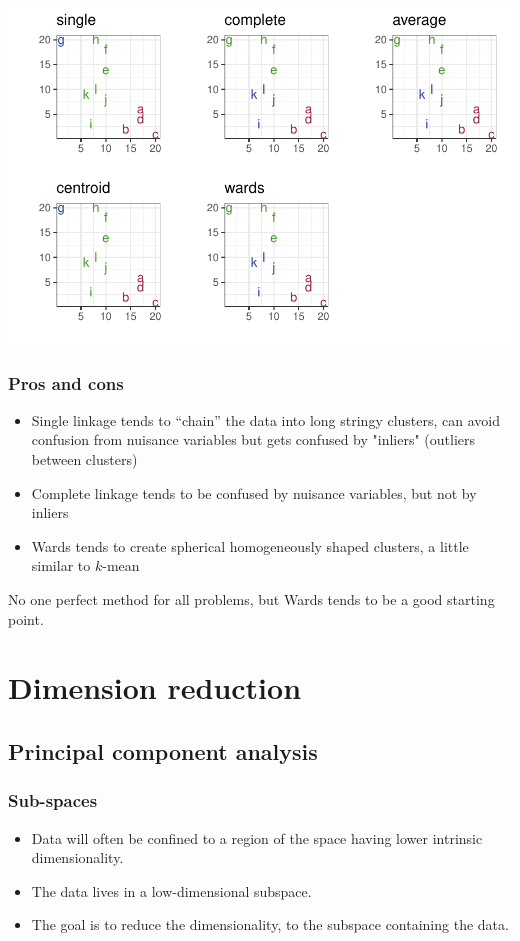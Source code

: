 \documentclass[a4paper]{article}\usepackage[]{graphicx}\usepackage[]{xcolor}
\makeatletter
\def\maxwidth{ %
  \ifdim\Gin@nat@width>\linewidth
    \linewidth
  \else
    \Gin@nat@width
  \fi
}
\makeatother
\begin{document}
\begin{Schunk}
{\centering \includegraphics[width=\maxwidth]{figure/listings-unnamed-chunk-484-1} 

}

\end{Schunk}
\subsubsection{Pros and cons}
\begin{itemize}
	\item Single linkage tends to ``chain'' the data into long stringy clusters, can avoid confusion from nuisance variables but gets confused by "inliers" (outliers between clusters)
	\item Complete linkage tends to be confused by nuisance variables, but not by inliers
	\item Wards tends to create spherical homogeneously shaped clusters, a little similar to \( k \)-mean
\end{itemize}
No one perfect method for all problems, but Wards tends to be a good starting point. 
\newpage

\section{Dimension reduction}\label{sec:35}
\subsection{Principal component analysis}
\subsubsection{Sub-spaces}
\begin{itemize}
	\item Data will often be confined to a region of the space having lower \textcolor{myred}{intrinsic dimensionality}.
	\item The data lives in a low-dimensional subspace.
	\item The goal is to \textcolor{myred}{reduce the dimensionality}, to the subspace containing the data.
\end{itemize}
\end{document}
